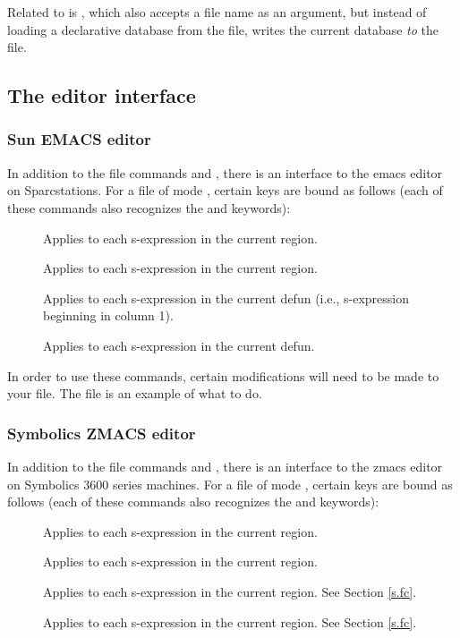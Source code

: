 Related to  is , which also accepts a
file name as an argument, but instead of loading a declarative
database from the file, writes the current database {\em to\/} the
file.

\subsection{The editor interface} 
\subsubsection{Sun EMACS editor}

In addition to the file commands  and
, there is an interface to the {\sc emacs} editor on
Sparcstations.  For a file of mode \mvl, certain keys are bound as
follows (each of these commands also recognizes the
 and  keywords):

 \begin{description}
 \item [] Applies  to each s-expression in the
current region.
 \item [] Applies  to each s-expression in the
current region.
 \item [] Applies  to each s-expression in the
current defun (i.e., s-expression beginning in column 1).
 \item [] Applies  to each s-expression in the
current defun.
 \end{description}

In order to use these commands, certain modifications will need to be made
to your  file.  The file  is an example of
what to do.

\subsubsection{Symbolics ZMACS editor}

In addition to the file commands  and
, there is an interface to the {\sc zmacs} editor on
Symbolics 3600 series machines.  For a file of mode \mvl, certain
keys are bound as follows (each of these commands also recognizes the
 and  keywords):

 \begin{description}
 \item [] Applies  to each s-expression in the
current region.
 \item [] Applies  to each s-expression in the
current region.
 \item [] Applies  to each s-expression in the
current region.  See Section \ref{s.fc}.
 \item [] Applies  to each s-expression in the
current region.  See Section \ref{s.fc}.
 \end{description}

